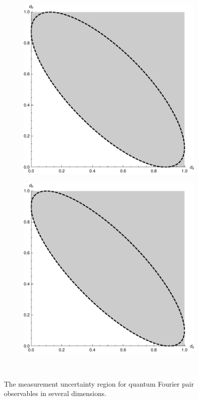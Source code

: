 \begin{figure}
\begin{subfigure}[t]{0.4\textwidth}
  \end{subfigure}\\
  \begin{subfigure}[t]{0.4\textwidth}
    \includegraphics[width=\textwidth]{fourier-ur-8}
  \end{subfigure}\quad
  \begin{subfigure}[t]{0.4\textwidth}
    \includegraphics[width=\textwidth]{fourier-ur-10}
  \end{subfigure}\\
  \caption{The measurement uncertainty region for quantum Fourier pair observables in several dimensions.}
\end{figure}

